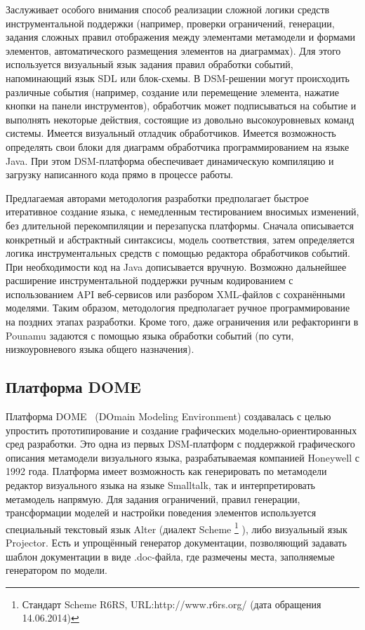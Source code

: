 Заслуживает особого внимания способ реализации сложной логики средств инструментальной 
поддержки (например, проверки ограничений, генерации, задания сложных правил отображения 
между элементами метамодели и формами элементов, автоматического размещения элементов 
на диаграммах). Для этого используется визуальный язык задания правил обработки событий, 
напоминающий язык SDL или блок-схемы. В DSM-решении могут происходить различные события 
(например, создание или перемещение элемента, нажатие кнопки на панели инструментов), 
обработчик может подписываться на событие и выполнять некоторые действия, состоящие из 
довольно высокоуровневых команд системы. Имеется визуальный отладчик обработчиков. 
Имеется возможность определять свои блоки для диаграмм обработчика программированием 
на языке Java. При этом DSM-платформа обеспечивает динамическую компиляцию и загрузку 
написанного кода прямо в процессе работы.

Предлагаемая авторами методология разработки предполагает быстрое итеративное создание 
языка, с немедленным тестированием вносимых изменений, без длительной перекомпиляции 
и перезапуска платформы. Сначала описывается конкретный и абстрактный синтаксисы, 
модель соответствия, затем определяется логика инструментальных средств с помощью 
редактора обработчиков событий. При необходимости код на Java дописывается вручную. 
Возможно дальнейшее расширение инструментальной поддержки ручным кодированием с использованием 
API веб-сервисов или разбором XML-файлов с сохранёнными моделями. Таким образом, методология 
предполагает ручное программирование на поздних этапах разработки. Кроме того, даже 
ограничения или рефакторинги в Pounamu задаются с помощью языка обработки событий 
(по сути, низкоуровневого языка общего назначения).

\subsection{Платформа DOME}
Платформа DOME~\cite{engstrom2000building, guide1999honeywell} (DOmain Modeling Environment) создавалась с целью упростить
прототипирование и создание графических модельно-ориентированных сред разработки. Это одна из первых
DSM-платформ с поддержкой графического описания метамодели визуального языка, разрабатываемая 
компанией Honeywell с 1992 года. Платформа имеет возможность как генерировать по метамодели редактор
визуального языка на языке Smalltalk, так и интерпретировать метамодель напрямую. Для
задания ограничений, правил генерации, трансформации моделей и настройки поведения элементов 
используется специальный текстовый язык Alter (диалект Scheme
\footnote{Стандарт Scheme R6RS, URL:http://www.r6rs.org/ (дата обращения 14.06.2014)}
), либо визуальный язык Projector. Есть и упрощённый генератор документации, позволяющий задавать шаблон документации в виде
.doc-файла, где размечены места, заполняемые генератором по модели.

